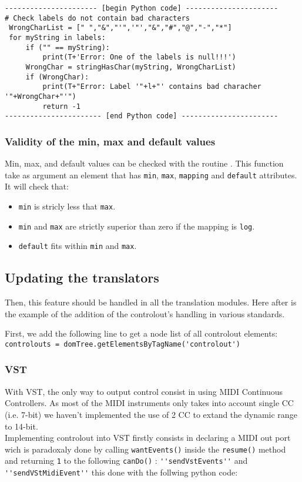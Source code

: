 \begin{verbatim}
---------------------- [begin Python code] ----------------------
# Check labels do not contain bad characters
 WrongCharList = [" ","&","'",'"',"&","#","@","-","*"]
 for myString in labels:
     if ("" == myString):
         print(T+'Error: One of the labels is null!!!')
     WrongChar = stringHasChar(myString, WrongCharList)
     if (WrongChar):
         print(T+"Error: Label '"+l+"' contains bad characher '"+WrongChar+"'")
         return -1
----------------------- [end Python code] -----------------------
\end{verbatim}

\subsubsection{Validity of the min, max and default values}
\noindent Min, max, and default values can be checked with the routine . This function take as argument an element that has \verb|min|, \verb|max|, \verb|mapping| and \verb|default| attributes. It will check that:

\begin{itemize}
\item{\verb|min| is stricly less that \verb|max|.}
\item{\verb|min| and \verb|max| are strictly superior than zero if the mapping is \verb|log|.}
\item{\verb|default| fits within \verb|min| and \verb|max|. }
\end{itemize}


\subsection{Updating the translators}

\noindent Then, this feature should be handled in all the translation
modules. Here after is the example of the addition of the controlout's
handling in various standards.  

\noindent First, we add the following line to get a node list of all
controlout elements:\\ 

\verb|controlouts = domTree.getElementsByTagName('controlout')|


\subsubsection{VST}
\noindent With VST, the only way to output control consist in using MIDI
Continuous Controllers. As most of the MIDI instruments only takes
into account single CC (i.e. 7-bit) we haven't implemented the use of
2 CC to extand the dynamic range to 14-bit.\\
\noindent Implementing controlout into VST firstly consists in declaring a
MIDI out port wich is paradoxaly done by calling \verb|wantEvents()|
inside the \verb|resume()| method and returning \verb|1| to the
following \verb|canDo()| : \verb|''sendVstEvents''| and
\verb|''sendVStMidiEvent''| this done with the follwing python code:

